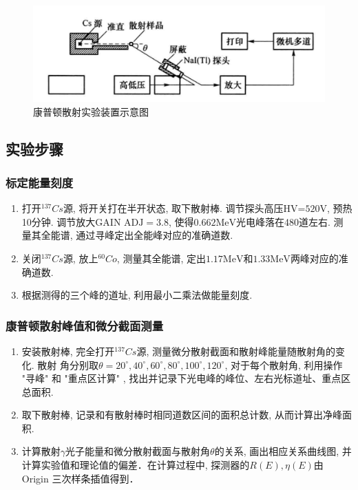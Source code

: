 \documentclass[font=default]{mpltx}
\begin{document}
\begin{figure}[htbp]
  \centering
  \includegraphics[width=0.6\linewidth]{fig/zhuangzhi.png}
  \caption{康普顿散射实验装置示意图}
  \label{fig:zhaungzhi}
\end{figure}


\subsection{实验步骤}
  \subsubsection{标定能量刻度}
    \begin{enumerate}
      \item 打开${^{137}Cs}$源, 将开关打在半开状态, 取下散射棒. 调节探头高压$\text{HV=520V}$, 预热10分钟. 调节放大$\text{GAIN ADJ} = 3.8$, 使得$0.662\text{MeV}$光电峰落在480道左右. 测量其全能谱, 通过寻峰定出全能峰对应的准确道数.
      \item 关闭${^{137}Cs}$源, 放上${^{60}Co}$, 测量其全能谱, 定出$1.17\text{MeV}$和$1.33\text{MeV}$两峰对应的准确道数.
      \item 根据测得的三个峰的道址, 利用最小二乘法做能量刻度. 
    \end{enumerate}

  \subsubsection{康普顿散射峰值和微分截面测量}
    \begin{enumerate}
      \item 安装散射棒, 完全打开${^{137}Cs}$源, 测量微分散射截面和散射峰能量随散射角的变化. 散射
      角分别取$\theta = 20^\circ,40^\circ ,60^\circ ,80^\circ ,100^\circ ,120^\circ $, 对于每个散射角, 利用操作
       "寻峰" 和 "重点区计算" , 找出并记录下光电峰的峰位、左右光标道址、重点区总面积. 
      \item 取下散射棒, 记录和有散射棒时相同道数区间的面积总计数, 从而计算出净峰面积.
      \item 计算散射$\gamma$光子能量和微分散射截面与散射角$\theta$的关系, 画出相应关系曲线图, 
      并计算实验值和理论值的偏差．在计算过程中, 探测器的$R(E), \eta(E)$由 Origin 三次样条插值得到．
    \end{enumerate}
\end{document}
